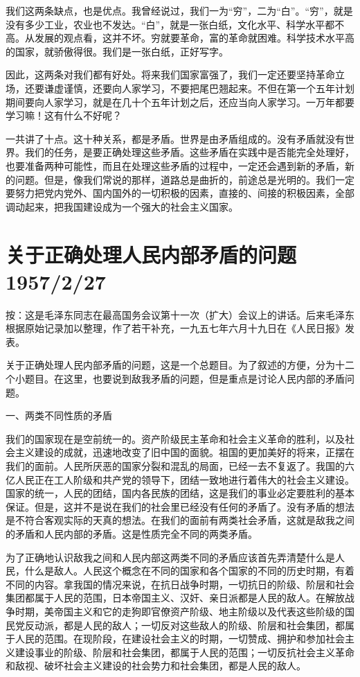 \documentclass[UTF8, 12pt, a4paper]{ctexrep}
\begin{document}
我们这两条缺点，也是优点。我曾经说过，我们一为“穷”，二为“白”。“穷”，就是没有多少工业，农业也不发达。“白”，就是一张白纸，文化水平、科学水平都不高。从发展的观点看，这并不坏。穷就要革命，富的革命就困难。科学技术水平高的国家，就骄傲得很。我们是一张白纸，正好写字。

因此，这两条对我们都有好处。将来我们国家富强了，我们一定还要坚持革命立场，还要谦虚谨慎，还要向人家学习，不要把尾巴翘起来。不但在第一个五年计划期间要向人家学习，就是在几十个五年计划之后，还应当向人家学习。一万年都要学习嘛！这有什么不好呢？

一共讲了十点。这十种关系，都是矛盾。世界是由矛盾组成的。没有矛盾就没有世界。我们的任务，是要正确处理这些矛盾。这些矛盾在实践中是否能完全处理好，也要准备两种可能性，而且在处理这些矛盾的过程中，一定还会遇到新的矛盾，新的问题。但是，像我们常说的那样，道路总是曲折的，前途总是光明的。我们一定要努力把党内党外、国内国外的一切积极的因素，直接的、间接的积极因素，全部调动起来，把我国建设成为一个强大的社会主义国家。

\section{关于正确处理人民内部矛盾的问题 1957/2/27}

按：这是毛泽东同志在最高国务会议第十一次（扩大）会议上的讲话。后来毛泽东根据原始记录加以整理，作了若干补充，一九五七年六月十九日在《人民日报》发表。

关于正确处理人民内部矛盾的问题，这是一个总题目。为了叙述的方便，分为十二个小题目。在这里，也要说到敌我矛盾的问题，但是重点是讨论人民内部的矛盾问题。

一、两类不同性质的矛盾

我们的国家现在是空前统一的。资产阶级民主革命和社会主义革命的胜利，以及社会主义建设的成就，迅速地改变了旧中国的面貌。祖国的更加美好的将来，正摆在我们的面前。人民所厌恶的国家分裂和混乱的局面，已经一去不复返了。我国的六亿人民正在工人阶级和共产党的领导下，团结一致地进行着伟大的社会主义建设。国家的统一，人民的团结，国内各民族的团结，这是我们的事业必定要胜利的基本保证。但是，这并不是说在我们的社会里已经没有任何的矛盾了。没有矛盾的想法是不符合客观实际的天真的想法。在我们的面前有两类社会矛盾，这就是敌我之间的矛盾和人民内部的矛盾。这是性质完全不同的两类矛盾。

为了正确地认识敌我之间和人民内部这两类不同的矛盾应该首先弄清楚什么是人民，什么是敌人。人民这个概念在不同的国家和各个国家的不同的历史时期，有着不同的内容。拿我国的情况来说，在抗日战争时期，一切抗日的阶级、阶层和社会集团都属于人民的范围，日本帝国主义、汉奸、亲日派都是人民的敌人。在解放战争时期，美帝国主义和它的走狗即官僚资产阶级、地主阶级以及代表这些阶级的国民党反动派，都是人民的敌人；一切反对这些敌人的阶级、阶层和社会集团，都属于人民的范围。在现阶段，在建设社会主义的时期，一切赞成、拥护和参加社会主义建设事业的阶级、阶层和社会集团，都属于人民的范围；一切反抗社会主义革命和敌视、破坏社会主义建设的社会势力和社会集团，都是人民的敌人。
\end{document}
